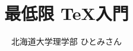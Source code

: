 
\newcommand{\centeralign}[1]{\rule{0pt}{0pt}\hfill#1\hfill\rule{0pt}{0pt}}
\newcommand{\typecommand}[1]{\colorbox{darkgray}{{\ttfamily\color{lime}#1}}}
\newcommand{\typecmdbox}[1]{
	\begin{tcolorbox}[
		sharp corners,left=0mm,right=0mm,top=0mm,bottom=0mm,
		colframe=darkgray,
		colback=darkgray,
	]
		{\ttfamily\color{lime}#1}
	\end{tcolorbox}
}

\setlength{\parskip}{2ex}

\title{最低限 \TeX 入門}
\author{北海道大学理学部 ひとみさん}
\date{\warekitoday}


\rubyusejghost %

\frame{\maketitle}

